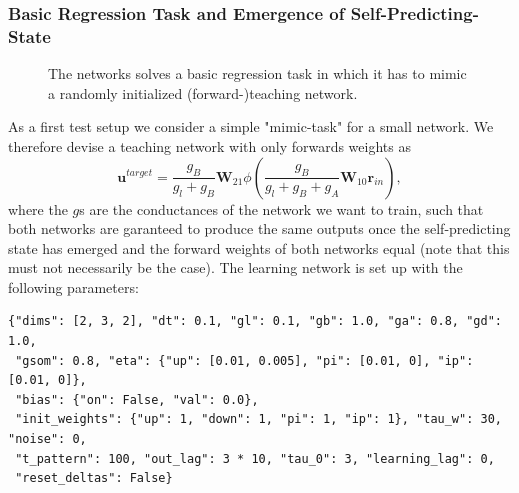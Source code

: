 \documentclass[12pt,a4paper]{article}
\begin{document}
\subsubsection{Basic Regression Task and Emergence of Self-Predicting-State}
\begin{figure}[!ht]
  \centering
  \quad
  \quad
  \quad
  \label{fig:mimic}
  \caption{The networks solves a basic regression task in which it has to mimic a randomly initialized (forward-)teaching network.}
\end{figure}

As a first test setup we consider a simple "mimic-task" for a small network. We therefore devise a teaching network with only forwards weights as 
\begin{equation}
\bm{u}^{target} = \frac{g_B}{g_l + g_B} \bm{W}_{21}\phi\left(\frac{g_B}{g_l + g_B + g_A} \bm{W}_{10} \bm{r}_{in}\right),
\end{equation}
where the $g$s are the conductances of the network we want to train, such that both networks are garanteed to produce the same outputs once the self-predicting state has emerged and the forward weights of both networks equal (note that this must not necessarily be the case). The learning network is set up with the following parameters:
\begin{verbatim}
{"dims": [2, 3, 2], "dt": 0.1, "gl": 0.1, "gb": 1.0, "ga": 0.8, "gd": 1.0,
 "gsom": 0.8, "eta": {"up": [0.01, 0.005], "pi": [0.01, 0], "ip": [0.01, 0]},
 "bias": {"on": False, "val": 0.0},
 "init_weights": {"up": 1, "down": 1, "pi": 1, "ip": 1}, "tau_w": 30, "noise": 0,
 "t_pattern": 100, "out_lag": 3 * 10, "tau_0": 3, "learning_lag": 0,
 "reset_deltas": False}
\end{verbatim}
\end{document}
